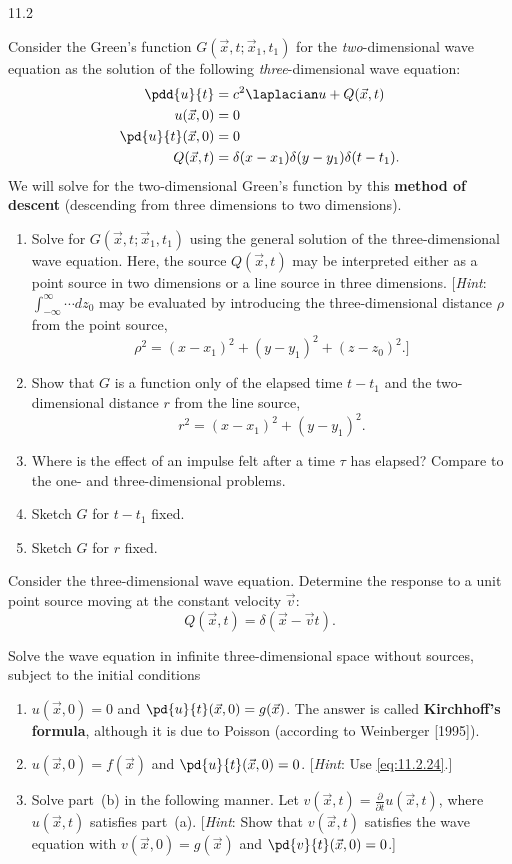 \begin{exercises}{11.2}
\item \label{ex:11.2.12}
Consider the Green's function $G(\vec{x},t;\vec{x}_1,t_1)$ for the \emph{two}-dimensional wave equation as the solution of the following \emph{three}-dimensional wave equation:
\begin{align*}
\pdd{u}{t} &= c^2\laplacian u + Q(\vec{x},t) \\
u(\vec{x},0) &= 0 \\
\pd{u}{t}(\vec{x},0) &= 0 \\
Q(\vec{x},t) &= \delta(x - x_1)\delta(y - y_1)\delta(t - t_1).
\end{align*}
We will solve for the two-dimensional Green's function by this \textbf{method of descent} (descending from three dimensions to two dimensions).
\begin{enumerate}
\item[\starred (a)] Solve for $G(\vec{x},t;\vec{x}_1,t_1)$ using the general solution of the three-dimensional wave equation.  Here, the source $Q(\vec{x},t)$ may be interpreted either as a point source in two dimensions or a line source in three dimensions.  [\emph{Hint}: $\int_{-\infty}^{\infty}\cdots dz_0$ may be evaluated by introducing the three-dimensional distance $\rho$ from the point source,
\[
\rho^2 = (x - x_1)^2 + (y - y_1)^2 + (z - z_0)^2.]
\]
\item[(b)] Show that $G$ is a function only of the elapsed time $t - t_1$ and the two-dimensional distance $r$ from the line source,
\[
r^2 = (x - x_1)^2 + (y - y_1)^2.
\]
\item[(c)] Where is the effect of an impulse felt after a time $\tau$ has elapsed?  Compare to the one- and three-dimensional problems.
\item[(d)] Sketch $G$ for $t - t_1$ fixed.
\item[(e)] Sketch $G$ for $r$ fixed.
\end{enumerate}

\item \label{ex:11.2.13}
Consider the three-dimensional wave equation.  Determine the response to a unit point source moving at the constant velocity $\vec{v}$:
\[
Q(\vec{x},t) = \delta(\vec{x} - \vec{v}t).
\]

\item \label{ex:11.2.14}
Solve the wave equation in infinite three-dimensional space without sources, subject to the initial conditions
\begin{enumerate}
\item[(a)] $u(\vec{x},0) = 0$ and $\pd{u}{t}(\vec{x},0) = g(\vec{x})$.  The answer is called \textbf{Kirchhoff's formula}, although it is due to Poisson (according to Weinberger [1995]).
\item[(b)] $u(\vec{x},0) = f(\vec{x})$ and $\pd{u}{t}(\vec{x},0) = 0$.  [\emph{Hint}: Use \eqref{eq:11.2.24}.]
\item[(c)] Solve part~(b) in the following manner.  Let $v(\vec{x},t) = \frac{\partial}{\partial t}u(\vec{x},t)$, where $u(\vec{x},t)$ satisfies part~(a).  [\emph{Hint}: Show that $v(\vec{x},t)$ satisfies the wave equation with $v(\vec{x},0) = g(\vec{x})$ and $\pd{v}{t}(\vec{x},0) = 0$.]
\end{enumerate}


\end{exercises}
